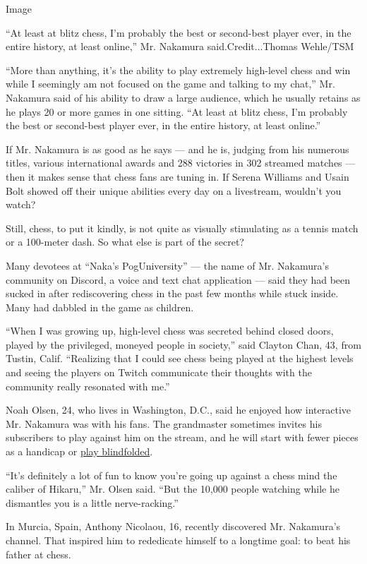 Image

``At least at blitz chess, I'm probably the best or second-best player
ever, in the entire history, at least online,'' Mr. Nakamura
said.Credit...Thomas Wehle/TSM

``More than anything, it's the ability to play extremely high-level
chess and win while I seemingly am not focused on the game and talking
to my chat,'' Mr. Nakamura said of his ability to draw a large audience,
which he usually retains as he plays 20 or more games in one sitting.
``At least at blitz chess, I'm probably the best or second-best player
ever, in the entire history, at least online.''

If Mr. Nakamura is as good as he says --- and he is, judging from his
numerous titles, various international awards and 288 victories in 302
streamed matches --- then it makes sense that chess fans are tuning in.
If Serena Williams and Usain Bolt showed off their unique abilities
every day on a livestream, wouldn't you watch?

Still, chess, to put it kindly, is not quite as visually stimulating as
a tennis match or a 100-meter dash. So what else is part of the secret?

Many devotees at ``Naka's PogUniversity'' --- the name of Mr. Nakamura's
community on Discord, a voice and text chat application --- said they
had been sucked in after rediscovering chess in the past few months
while stuck inside. Many had dabbled in the game as children.

``When I was growing up, high-level chess was secreted behind closed
doors, played by the privileged, moneyed people in society,'' said
Clayton Chan, 43, from Tustin, Calif. ``Realizing that I could see chess
being played at the highest levels and seeing the players on Twitch
communicate their thoughts with the community really resonated with
me.''

Noah Olsen, 24, who lives in Washington, D.C., said he enjoyed how
interactive Mr. Nakamura was with his fans. The grandmaster sometimes
invites his subscribers to play against him on the stream, and he will
start with fewer pieces as a handicap or
\href{https://www.youtube.com/watch?v=MrEX8NNkQ5Y}{play blindfolded}.

``It's definitely a lot of fun to know you're going up against a chess
mind the caliber of Hikaru,'' Mr. Olsen said. ``But the 10,000 people
watching while he dismantles you is a little nerve-racking.''

In Murcia, Spain, Anthony Nicolaou, 16, recently discovered Mr.
Nakamura's channel. That inspired him to rededicate himself to a
longtime goal: to beat his father at chess.

